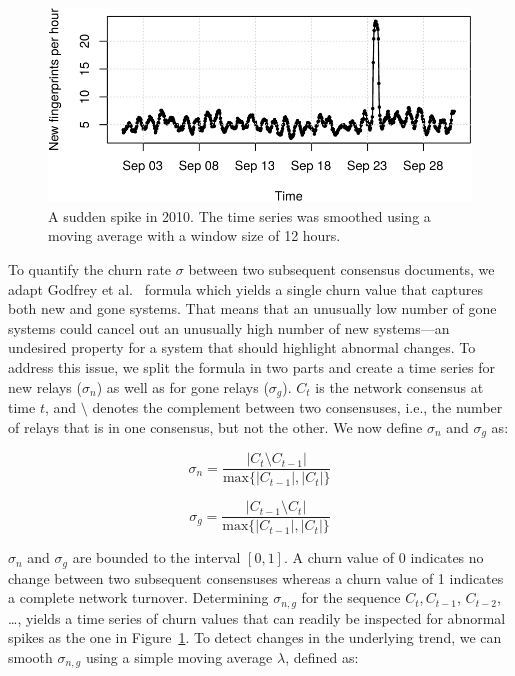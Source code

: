 \begin{figure}[t]
	\centering
	\includegraphics[width=\linewidth]{diagrams/sudden-spike.pdf}
	\caption{A sudden spike in 2010.  The time series was smoothed using a
	moving average with a window size of 12 hours.}
	\label{fig:sudden-spike}
\end{figure}

To quantify the churn rate $\sigma$ between two subsequent consensus documents,
we adapt Godfrey et al.~\cite{Godfrey2006a} formula which yields a single churn
value that captures both new and gone systems.  That means that an unusually low
number of gone systems could cancel out an unusually high number of new
systems---an undesired property for a system that should highlight abnormal
changes.  To address this issue, we split the formula in two parts and create a
time series for new relays ($\sigma_{n}$) as well as for gone relays
($\sigma_{g}$).  $C_{t}$ is the network consensus at time $t$, and $\setminus$
denotes the complement between two consensuses, i.e., the number of relays that
is in one consensus, but not the other.  We now define $\sigma_{n}$ and
$\sigma_{g}$ as:

\begin{equation}
\sigma_{n} = \frac{\lvert C_{t} \setminus C_{t-1} \rvert}
{\textrm{max}\{\lvert C_{t-1} \rvert, \lvert C_{t} \rvert \}}
\end{equation}

\begin{equation}
\sigma_{g} = \frac{\lvert C_{t-1} \setminus C_{t} \rvert}
{\textrm{max}\{\lvert C_{t-1} \rvert, \lvert C_{t} \rvert \}}
\end{equation}

$\sigma_{n}$ and $\sigma_{g}$ are bounded to the interval $[0, 1]$.  A churn
value of 0 indicates no change between two subsequent consensuses whereas a
churn value of 1 indicates a complete network turnover.  Determining
$\sigma_{n,g}$ for the sequence $C_{t}, C_{t-1}$, $C_{t-2}$, \ldots, yields a
time series of churn values that can readily be inspected for abnormal spikes as
the one in Figure~\ref{fig:sudden-spike}.  To detect changes in the underlying
trend, we can smooth $\sigma_{n,g}$ using a simple moving average $\lambda$,
defined as:

